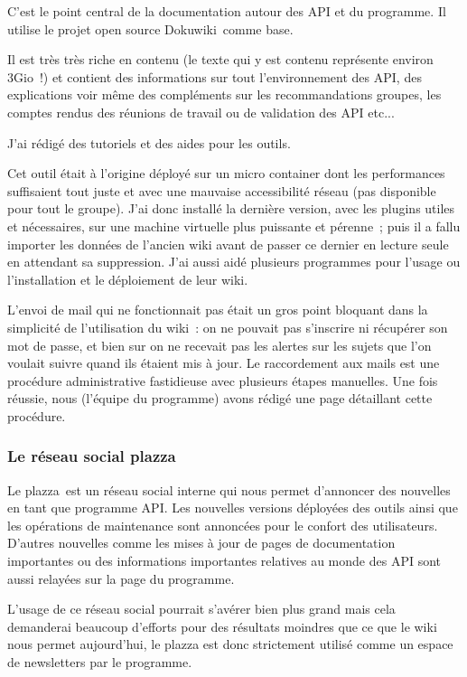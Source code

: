         C'est le point central de la documentation autour des API et du programme.
        Il utilise le projet open source Dokuwiki\, comme base.

        Il est très très riche en contenu (le texte qui y est contenu représente environ 3Gio !) et contient des informations sur tout l’environnement des API, des explications voir même des compléments sur les recommandations groupes, les comptes rendus des réunions de travail ou de validation des API etc...

        J’ai rédigé des tutoriels et des aides pour les outils.

        Cet outil était à l’origine déployé sur un micro container dont les performances suffisaient tout juste et avec une mauvaise accessibilité réseau (pas disponible pour tout le groupe).
        J’ai donc installé la dernière version, avec les plugins utiles et nécessaires, sur une machine virtuelle plus puissante et pérenne ;  puis il a fallu importer les données de l’ancien wiki avant de passer ce dernier en lecture seule en attendant sa suppression.
        J’ai aussi aidé plusieurs programmes pour l’usage ou l’installation et le déploiement de leur wiki.

        L’envoi de mail qui ne fonctionnait pas était un gros point bloquant dans la simplicité de l’utilisation du wiki : on ne pouvait pas s’inscrire ni récupérer son mot de passe, et bien sur on ne recevait pas les alertes sur les sujets que l’on voulait  suivre quand ils étaient mis à jour.
        Le raccordement aux mails est une procédure administrative fastidieuse avec plusieurs étapes manuelles.
        Une fois réussie, nous (l’équipe du programme) avons rédigé une page détaillant cette procédure.

        \subsubsection{Le réseau social plazza}

        Le plazza\,  est un réseau social interne qui nous permet d’annoncer des nouvelles en tant que programme API.
        Les nouvelles versions déployées des outils ainsi que les opérations de maintenance sont annoncées pour le confort des utilisateurs.
        D’autres nouvelles comme les mises à jour de pages de documentation importantes ou des informations importantes relatives au monde des API sont aussi relayées sur la page du programme.

        L’usage de ce réseau social pourrait s'avérer bien plus grand mais cela demanderai beaucoup d’efforts pour des résultats moindres que ce que le wiki nous permet aujourd’hui, le plazza est donc strictement utilisé comme un espace de newsletters par le programme.

